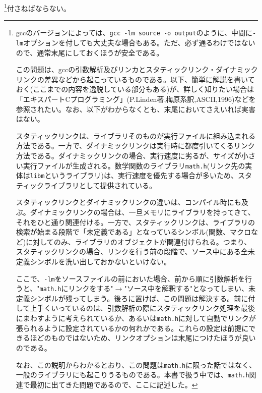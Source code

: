 \footnote{gccのバージョンによっては、\verb|gcc -lm source -o output|のように、中間に\verb|-lm|オプションを付しても大丈夫な場合もある。ただ、必ず通るわけではないので、通常末尾にしておくほうが安全である。

この問題は、gccの引数解析及びリンカとスタティックリンク・ダイナミックリンクの差異などから起こっているものである。以下、簡単に解説を書いておく(ここまでの内容を逸脱している部分もある)が、詳しく知りたい場合は「エキスパートCプログラミング」(P.Linden著,梅原系訳,ASCII,1996)などを参照されたい。なお、以下がわからなくとも、末尾においてさえいれば実害はない。

スタティックリンクは、ライブラリそのものが実行ファイルに組み込まれる方法である。一方で、ダイナミックリンクは実行時に都度引いてくるリンク方法である。ダイナミックリンクの場合、実行速度に劣るが、サイズが小さい実行ファイルが生成される。数学関数のライブラリ\verb|math.h|(リンク先の実体は\verb|libm|というライブラリ)は、実行速度を優先する場合が多いため、スタティックライブラリとして提供されている。

スタティックリンクとダイナミックリンクの違いは、コンパイル時にも及ぶ。ダイナミックリンクの場合は、一旦メモリにライブラリを持ってきて、それをひと通り関連付ける。一方で、スタティックリンクは、ライブラリの検索が始まる段階で「未定義である」となっているシンボル(関数、マクロなど)に対してのみ、ライブラリのオブジェクトが関連付けられる。つまり、スタティックリンクの場合、リンクを行う前の段階で、ソース中にある全未定義シンボルを洗い出しておかないといけない。

ここで、\verb|-lm|をソースファイルの前においた場合、前から順に引数解析を行うと、"\verb|math.h|にリンクをする"$\rightarrow$"ソース中を解釈する"となってしまい、未定義シンボルが残ってしまう。後ろに置けば、この問題は解決する。前に付して上手くいっているのは、引数解析の際にスタティックリンク処理を最後にまわすように考えられているか、あるいは\verb|math.h|に対して自動でリンクが張られるように設定されているかの何れかである。これらの設定は前提にできるほどのものではないため、リンクオプションは末尾につけたほうが良いのである。

なお、この説明からわかるとおり、この問題は\verb|math.h|に限った話ではなく、一般のライブラリにも起こりうるものである。本書で扱う中では、\verb|math.h|関連で最初に出てきた問題であるので、ここに記述した。}付さねばならない。


